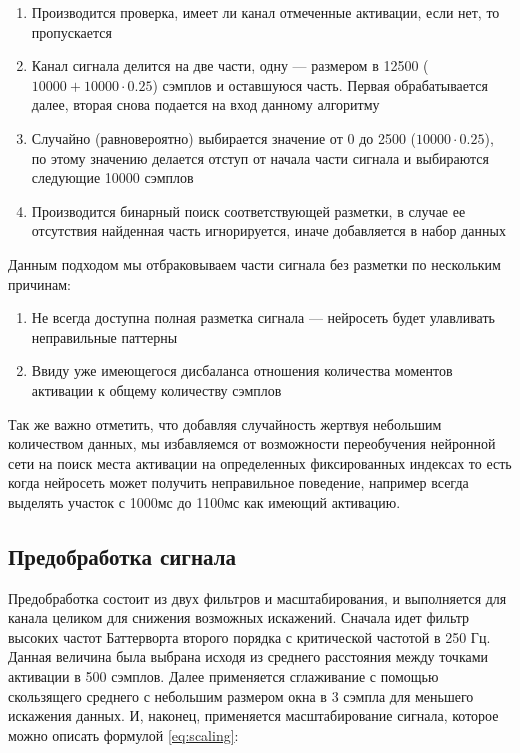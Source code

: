 \begin{enumerate}
	\item Производится проверка, имеет ли канал отмеченные активации, если нет,
	то пропускается

	\item Канал сигнала делится на две части, одну --- размером в 12500 ($10000
		+ 10000 \cdot 0.25$) сэмплов и оставшуюся часть. Первая обрабатывается
	далее, вторая снова подается на вход данному алгоритму

	\item Случайно (равновероятно) выбирается значение от 0 до 2500 ($10000
		\cdot 0.25$), по этому значению делается отступ от начала части сигнала и
	выбираются следующие 10000 сэмплов

	\item Производится бинарный поиск соответствующей разметки, в случае ее
	отсутствия найденная часть игнорируется, иначе добавляется в набор данных

\end{enumerate}

\noindent Данным подходом мы отбраковываем части сигнала без разметки по нескольким причинам:
\begin{enumerate}
	\item Не всегда доступна полная разметка сигнала --- нейросеть будет улавливать
	неправильные паттерны

	\item Ввиду уже имеющегося дисбаланса отношения количества моментов активации к
	общему количеству сэмплов

\end{enumerate}

Так же важно отметить, что добавляя случайность жертвуя небольшим количеством
данных, мы избавляемся от возможности переобучения нейронной сети на поиск
места активации на определенных фиксированных индексах то есть когда нейросеть может
получить неправильное поведение, например всегда выделять участок с 1000мс до
1100мс как имеющий активацию.

\subsection{Предобработка сигнала}

Предобработка состоит из двух фильтров и масштабирования, и выполняется для
канала целиком для снижения возможных искажений. Сначала идет фильтр высоких
частот Баттерворта второго порядка с критической частотой в 250 Гц. Данная
величина была выбрана исходя из среднего расстояния между точками активации в
500 сэмплов. Далее применяется сглаживание с помощью скользящего среднего с
небольшим размером окна в 3 сэмпла для меньшего искажения данных. И, наконец,
применяется масштабирование сигнала, которое можно описать формулой
\ref{eq:scaling}:

